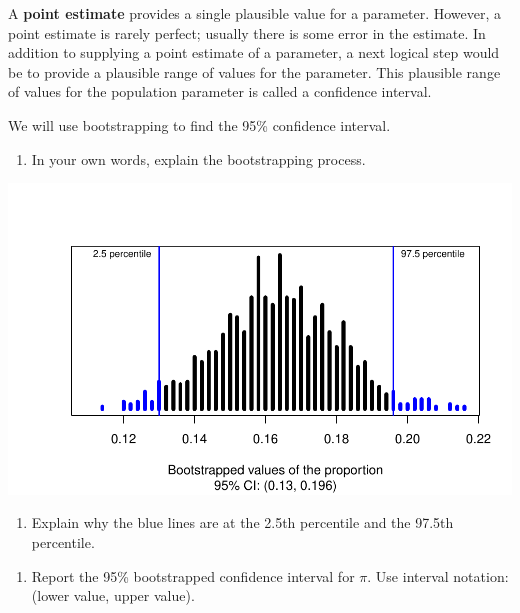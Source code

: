 \documentclass[
]{report}
\providecommand{\tightlist}{%
  \setlength{\itemsep}{0pt}\setlength{\parskip}{0pt}}
\begin{document}
A \textbf{point estimate} provides a single plausible value for a parameter. However, a point estimate is rarely perfect; usually there is some error in the estimate. In addition to supplying a point estimate of a parameter, a next logical step would be to provide a plausible range of values for the parameter. This plausible range of values for the population parameter is called a confidence interval.

We will use bootstrapping to find the 95\% confidence interval.

\begin{enumerate}
\def\labelenumi{\arabic{enumi}.}
\setcounter{enumi}{23}
\tightlist
\item
  In your own words, explain the bootstrapping process.
  \vspace{1in}
\end{enumerate}

\begin{center}\includegraphics[width=0.7\linewidth]{06-inference-1cat_files/figure-latex/unnamed-chunk-6-1} \end{center}

\begin{enumerate}
\def\labelenumi{\arabic{enumi}.}
\setcounter{enumi}{24}
\tightlist
\item
  Explain why the blue lines are at the 2.5th percentile and the 97.5th percentile.
\end{enumerate}

\vspace{1in}

\begin{enumerate}
\def\labelenumi{\arabic{enumi}.}
\setcounter{enumi}{25}
\tightlist
\item
  Report the 95\% bootstrapped confidence interval for \(\pi\). Use interval notation: (lower value, upper value).
\end{enumerate}

\vspace{1in}
\end{document}
